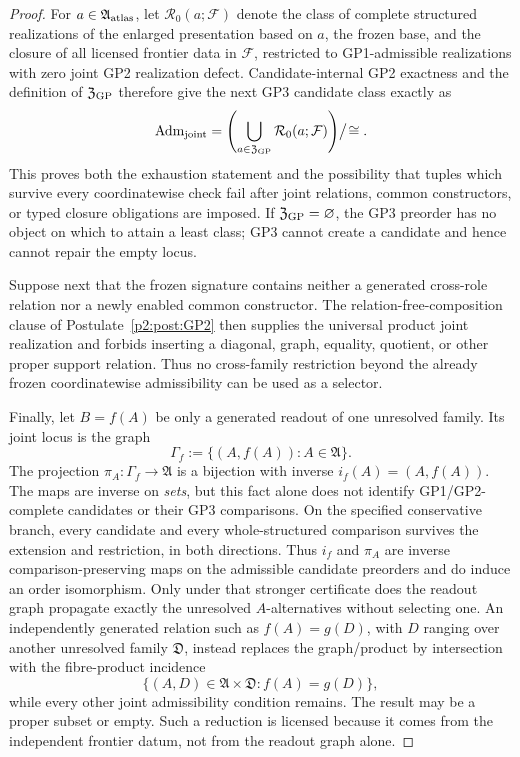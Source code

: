 \documentclass[12pt,a4paper]{article}
\begin{document}
\begin{proof}
For \(a\in\mathfrak A_{\rm atlas}\), let
\(\mathcal R_0(a;\mathcal F)\) denote the class of complete structured
realizations of the enlarged presentation based on \(a\), the frozen base,
and the closure of all licensed frontier data in \(\mathcal F\), restricted
to GP1-admissible realizations with zero joint GP2 realization defect.
Candidate-internal GP2 exactness and the definition of
\(\mathfrak Z_{\rm GP}\) therefore give the next GP3 candidate class exactly
as
\[
 \operatorname{Adm}_{\rm joint}
 =
 \left(
   \bigcup_{a\in\mathfrak Z_{\rm GP}}
      \mathcal R_0(a;\mathcal F)
 \right)\!\big/\!\cong .
\]
This proves both the exhaustion statement and the possibility that tuples
which survive every coordinatewise check fail after joint relations, common
constructors, or typed closure obligations are imposed.  If
\(\mathfrak Z_{\rm GP}=\varnothing\), the GP3 preorder has no object on which
to attain a least class; GP3 cannot create a candidate and hence cannot repair
the empty locus.

Suppose next that the frozen signature contains neither a generated
cross-role relation nor a newly enabled common constructor.  The
relation-free-composition clause of Postulate~\ref{p2:post:GP2} then supplies
the universal product joint realization and forbids inserting a diagonal,
graph, equality, quotient, or other proper support relation.  Thus no
cross-family restriction beyond the already frozen coordinatewise
admissibility can be used as a selector.

Finally, let \(B=f(A)\) be only a generated readout of one unresolved family.
Its joint locus is the graph
\[
 \Gamma_f:=\{(A,f(A)):A\in\mathfrak A\}.
\]
The projection \(\pi_A:\Gamma_f\to\mathfrak A\) is a bijection with inverse
\(i_f(A)=(A,f(A))\).  The maps are inverse on \emph{sets}, but this fact alone does not
identify GP1/GP2-complete candidates or their GP3 comparisons.  On the
specified conservative branch, every candidate and every whole-structured
comparison survives the extension and restriction, in both directions.
Thus \(i_f\) and \(\pi_A\) are inverse comparison-preserving maps on the
admissible candidate preorders and do induce an order isomorphism.  Only
under that stronger certificate does the readout graph propagate exactly
the unresolved \(A\)-alternatives without selecting one.
An independently generated relation such as \(f(A)=g(D)\), with
\(D\) ranging over another unresolved family \(\mathfrak D\), instead replaces
the graph/product by intersection with the fibre-product incidence
\[
 \{(A,D)\in\mathfrak A\times\mathfrak D:f(A)=g(D)\},
\]
while every other joint admissibility condition remains. The result may be
a proper subset or empty.  Such a reduction is licensed because
it comes from the independent frontier datum, not from the readout graph
alone.
\end{proof}
\end{document}
